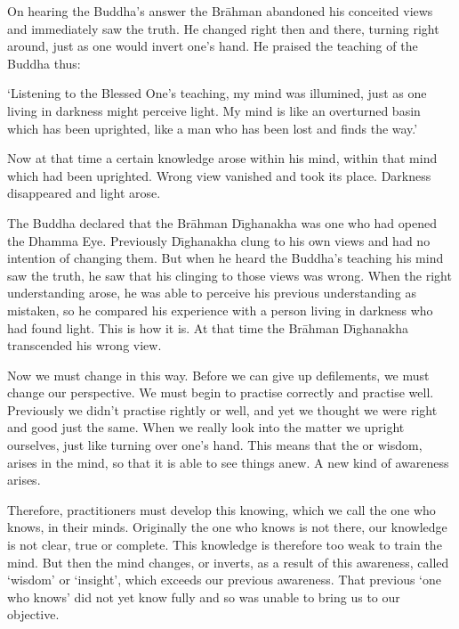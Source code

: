 On hearing the Buddha's answer the Br\=ahman abandoned his conceited views and immediately saw the truth. He changed right then and there, turning right around, just as one would invert one's hand. He praised the teaching of the Buddha thus: 

`Listening to the Blessed One's teaching, my mind was illumined, just as one living in darkness might perceive light. My mind is like an overturned basin which has been uprighted, like a man who has been lost and finds the way.' 

Now at that time a certain knowledge arose within his mind, within that mind which had been uprighted. Wrong view vanished and  took its place. Darkness disappeared and light arose. 

The Buddha declared that the Br\=ahman D\={\i}ghanakha was one who had opened the Dhamma Eye. Previously D\={\i}ghanakha clung to his own views and had no intention of changing them. But when he heard the Buddha's teaching his mind saw the truth, he saw that his clinging to those views was wrong. When the right understanding arose, he was able to perceive his previous understanding as mistaken, so he compared his experience with a person living in darkness who had found light. This is how it is. At that time the Br\=ahman D\={\i}ghanakha transcended his wrong view. 

Now we must change in this way. Before we can give up defilements, we must change our perspective. We must begin to practise correctly and practise well. Previously we didn't practise rightly or well, and yet we thought we were right and good just the same. When we really look into the matter we upright ourselves, just like turning over one's hand. This means that the  or wisdom, arises in the mind, so that it is able to see things anew. A new kind of awareness arises. 

Therefore, practitioners must develop this knowing, which we call  the one who knows, in their minds. Originally the one who knows is not there, our knowledge is not clear, true or complete. This knowledge is therefore too weak to train the mind. But then the mind changes, or inverts, as a result of this awareness, called `wisdom' or `insight', which exceeds our previous awareness. That previous `one who knows' did not yet know fully and so was unable to bring us to our objective. 

